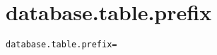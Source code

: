 \section{database.table.prefix}
\label{configuration:DatabaseTablePrefix}
\ClearAPI
\TODO
{}
\begin{lstlisting}[style=Props,caption={Usage example for \textit{database.table.prefix}}]
database.table.prefix=
\end{lstlisting}